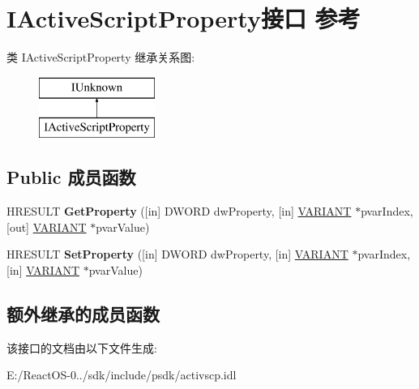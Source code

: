 \hypertarget{interface_i_active_script_property}{}\section{I\+Active\+Script\+Property接口 参考}
\label{interface_i_active_script_property}
类 I\+Active\+Script\+Property 继承关系图\+:\begin{figure}[H]
\begin{center}
\leavevmode
\includegraphics[height=2.000000cm]{interface_i_active_script_property}
\end{center}
\end{figure}
\subsection*{Public 成员函数}
\begin{DoxyCompactItemize}
\item 
\mbox{\label{interface_i_active_script_property_ad2a81763a81a9ecc059a53a55200a0fd}} 
H\+R\+E\+S\+U\+LT {\bfseries Get\+Property} (\mbox{[}in\mbox{]} D\+W\+O\+RD dw\+Property, \mbox{[}in\mbox{]} \hyperlink{structtag_v_a_r_i_a_n_t}{V\+A\+R\+I\+A\+NT} $\ast$pvar\+Index, \mbox{[}out\mbox{]} \hyperlink{structtag_v_a_r_i_a_n_t}{V\+A\+R\+I\+A\+NT} $\ast$pvar\+Value)
\item 
\mbox{\label{interface_i_active_script_property_a7662be10ad3cfe64d7d54dbb52519a32}} 
H\+R\+E\+S\+U\+LT {\bfseries Set\+Property} (\mbox{[}in\mbox{]} D\+W\+O\+RD dw\+Property, \mbox{[}in\mbox{]} \hyperlink{structtag_v_a_r_i_a_n_t}{V\+A\+R\+I\+A\+NT} $\ast$pvar\+Index, \mbox{[}in\mbox{]} \hyperlink{structtag_v_a_r_i_a_n_t}{V\+A\+R\+I\+A\+NT} $\ast$pvar\+Value)
\end{DoxyCompactItemize}
\subsection*{额外继承的成员函数}


该接口的文档由以下文件生成\+:\begin{DoxyCompactItemize}
\item 
E\+:/\+React\+O\+S-\/0../sdk/include/psdk/activscp.\+idl\end{DoxyCompactItemize}

